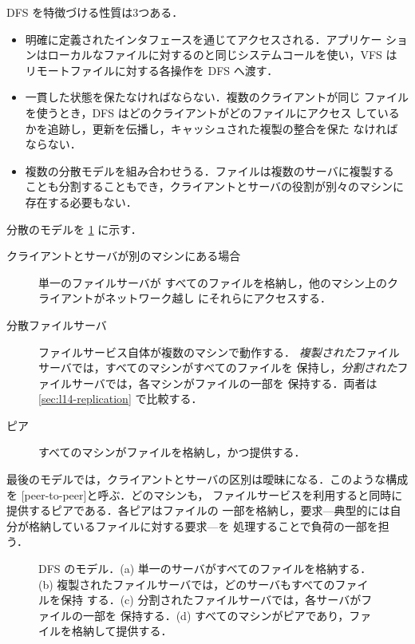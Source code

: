 \documentclass[../main.tex]{subfiles}
\begin{document}
DFS を特徴づける性質は3つある．
\begin{itemize}
  \item 明確に定義されたインタフェースを通じてアクセスされる．アプリケー
    ションはローカルなファイルに対するのと同じシステムコールを使い，VFS は
    リモートファイルに対する各操作を DFS へ渡す．
  \item 一貫した状態を保たなければならない．複数のクライアントが同じ
    ファイルを使うとき，DFS はどのクライアントがどのファイルにアクセス
    しているかを追跡し，更新を伝播し，キャッシュされた複製の整合を保た
    なければならない．
  \item 複数の分散モデルを組み合わせうる．ファイルは複数のサーバに複製する
    ことも分割することもでき，クライアントとサーバの役割が別々のマシンに
    存在する必要もない．
\end{itemize}

分散のモデルを \cref{fig:l14-models} に示す．
\begin{description}
  \item[クライアントとサーバが別のマシンにある場合] 単一のファイルサーバが
    すべてのファイルを格納し，他のマシン上のクライアントがネットワーク越し
    にそれらにアクセスする．
  \item[分散ファイルサーバ] ファイルサービス自体が複数のマシンで動作する．
    \emph{複製された}ファイルサーバでは，すべてのマシンがすべてのファイルを
    保持し，\emph{分割された}ファイルサーバでは，各マシンがファイルの一部を
    保持する．両者は \cref{sec:l14-replication} で比較する．
  \item[ピア] すべてのマシンがファイルを格納し，かつ提供する．
\end{description}

最後のモデルでは，クライアントとサーバの区別は曖昧になる．このような構成を
[peer-to-peer]と呼ぶ．どのマシンも，
ファイルサービスを利用すると同時に提供するピアである．各ピアはファイルの
一部を格納し，要求---典型的には自分が格納しているファイルに対する要求---を
処理することで負荷の一部を担う．

\begin{figure}[htbp]
  \centering
  
  \caption{DFS のモデル．(a) 単一のサーバがすべてのファイルを格納する．
    (b) 複製されたファイルサーバでは，どのサーバもすべてのファイルを保持
    する．(c) 分割されたファイルサーバでは，各サーバがファイルの一部を
    保持する．(d) すべてのマシンがピアであり，ファイルを格納して提供する．}
  \label{fig:l14-models}
\end{figure}
\end{document}
